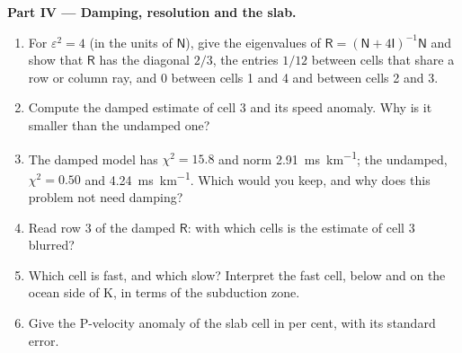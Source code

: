 \begin{problem}
\noindent\textbf{Part IV --- Damping, resolution and the slab.}
\begin{enumerate}[resume]
  \item For $\varepsilon^2 = 4$ (in the units of $\mathsf N$), give the
        eigenvalues of $\mathsf R = (\mathsf N + 4\mathsf I)^{-1}\mathsf N$ and
        show that $\mathsf R$ has the diagonal $2/3$, the entries $1/12$
        between cells that share a row or column ray, and $0$ between cells 1
        and 4 and between cells 2 and 3.
  \item Compute the damped estimate of cell 3 and its speed anomaly. Why is it
        smaller than the undamped one?
  \item The damped model has $\chi^2 = 15.8$ and norm \qty{2.91}{ms.km^{-1}};
        the undamped, $\chi^2 = 0.50$ and \qty{4.24}{ms.km^{-1}}. Which would
        you keep, and why does this problem not need damping?
  \item Read row 3 of the damped $\mathsf R$: with which cells is the estimate
        of cell 3 blurred?
  \item Which cell is fast, and which slow? Interpret the fast cell, below and
        on the ocean side of K, in terms of the subduction zone.
  \item Give the P-velocity anomaly of the slab cell in per cent, with its
        standard error.
\end{enumerate}
\end{problem}
